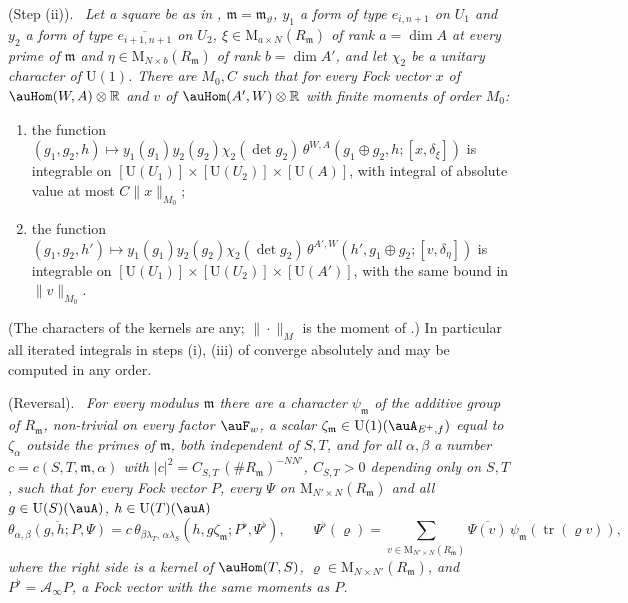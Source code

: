 \documentclass[10pt]{amsart}
\theoremstyle{definition}
\theoremstyle{remark}
\newcommand{\R}{\mathbb R}
\providecommand{\auU}{\mathrm U}
\providecommand{\aubar}[1]{\overline{#1}}
\providecommand{\pcMat}{\mathrm M}
\providecommand{\pcR}{R}
\providecommand{\pcm}{\mathfrak m}
\providecommand{\ptvtr}{\operatorname{tr}}
\newenvironment{quotedthm}[2]{\par\medskip\noindent\begingroup
  \textbf{#1}#2.\ \itshape\ignorespaces}{\endgroup\par\medskip}
\begin{document}
\begin{quotedthm}{\cite[Proposition~4.10]{P53}}{ (Step (ii))}
Let a square be as in {\cite[\S4.1.3]{P53}}, $\pcm=\pcm_\vartheta$, $y_1$ a form of type
$e_{i,n+1}$ on $U_1$ and $y_2$ a form of type $\overline{e_{i+1,n+1}}$ on $U_2$, $\xi\in\pcMat_{a\times
N}(\pcR_\pcm)$ of rank $a=\dim A$ at every prime of $\pcm$ and $\eta\in\pcMat_{N\times b}(\pcR_\pcm)$ of rank
$b=\dim A'$, and let $\chi_2$ be a unitary character of $\auU(1)$. There are $M_0,C$ such that
for every Fock vector $x$ of $\auHom(W,A)\otimes\R$ and $v$ of $\auHom(A',W)\otimes\R$ with finite
moments of order $M_0$:
\begin{enumerate}
\item[(a)] the function $(g_1,g_2,h)\mapsto y_1(g_1)y_2(g_2)\chi_2(\det g_2)\,\theta^{W,A}(g_1\oplus g_2,h;
[x,\delta_\xi])$ is integrable on $[\auU(U_1)]\times[\auU(U_2)]\times[\auU(A)]$, with integral of absolute
value at most $C\|x\|_{M_0}$;
\item[(b)] the function $(g_1,g_2,h')\mapsto y_1(g_1)y_2(g_2)\chi_2(\det g_2)\,\theta^{A',W}(h',g_1\oplus
g_2;[v,\delta_\eta])$ is integrable on $[\auU(U_1)]\times[\auU(U_2)]\times[\auU(A')]$, with the same bound
in $\|v\|_{M_0}$.
\end{enumerate}
(The characters of the kernels are any; $\|\cdot\|_M$ is the moment of {\cite[Proposition~3.26]{P53}}.)
In particular all iterated integrals in steps (i), (iii) of {\cite[\S2.6]{P53}} converge
absolutely and may be computed in any order.
\end{quotedthm}

\begin{quotedthm}{\cite[Proposition~4.40]{P53}}{ (Reversal)}
For every modulus $\pcm$ there are a character $\psi_\pcm$ of the additive group of $\pcR_\pcm$,
non-trivial on every factor $\auF_w$, a scalar $\zeta_\pcm\in\auU(1)(\auA_{E^+,f})$ equal to
$\zeta_\alpha$ outside the primes of $\pcm$, both independent of $S,T$, and for all $\alpha,\beta$ a
number $c=c(S,T,\pcm,\alpha)$ with $|c|^2=C_{S,T}\,(\#\pcR_\pcm)^{-NN'}$, $C_{S,T}>0$ depending only on
$S,T$, such that for every Fock vector $P$, every $\Psi$ on $\pcMat_{N'\times N}(\pcR_\pcm)$ and all
$g\in\auU(S)(\auA)$, $h\in\auU(T)(\auA)$
\[
\aubar{\theta_{\alpha,\beta}(g,h;P,\Psi)}=c\,\theta_{\beta\lambda_T,\,\alpha\lambda_S}(h,g\zeta_\pcm;
P^\flat,\Psi^\flat),\qquad\Psi^\flat(\varrho)=\sum_{v\in\pcMat_{N'\times N}(\pcR_\pcm)}\aubar{\Psi(v)}\,
\psi_\pcm(\ptvtr(\varrho v)),
\]
where the right side is a kernel of $\auHom(T,S)$, $\varrho\in\pcMat_{N\times N'}(\pcR_\pcm)$, and
$P^\flat=\mathcal A_\infty P$, a Fock vector with the same moments as $P$.
\end{quotedthm}
\end{document}
